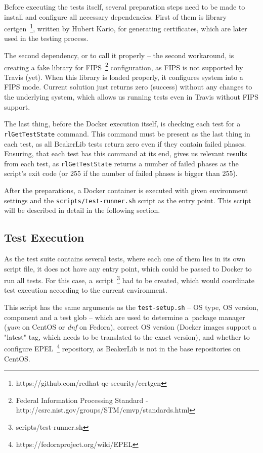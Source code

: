     Before executing the tests itself, several preparation steps need to be made
    to install and configure all necessary dependencies. First of them is
    library certgen~\footnote{https://github.com/redhat-qe-security/certgen},
    written by Hubert Kario, for generating certificates, which are later used
    in the testing process.

    The second dependency, or to call it properly -- the second workaround, is
    creating a fake library for
    FIPS~\footnote{Federal Information Processing Standard - http://csrc.nist.gov/groups/STM/cmvp/standards.html}
    configuration, as FIPS is not supported
    by Travis (yet). When this library is loaded properly, it configures
    system into a FIPS mode. Current solution just returns zero (success) without
    any changes to the underlying system, which allows us running tests even in
    Travis without FIPS support.

    The last thing, before the Docker execution itself, is checking each test
    for a \texttt{rlGetTestState} command. This command must be present as
    the last thing in each test, as all BeakerLib tests return zero even
    if they contain failed phases. Ensuring, that each test has this command
    at its end, gives us relevant results from each test, as
    \texttt{rlGetTestState} returns a number of failed phases as the script's
    exit code (or 255 if the number of failed phases is bigger
    than 255).~\cite{beakerlib-gh-man}

    After the preparations, a Docker container is executed with given environment
    settings and the \texttt{scripts/test-runner.sh} script as the entry point.
    This script will be described in detail in the following section.

\subsection{Test Execution} \label{ref:test-execution}
    As the test suite contains several tests, where each one of them lies in
    its own script file, it does not have any entry point, which could be passed
    to Docker to run all tests. For this case,
    a~script~\footnote{scripts/test-runner.sh} had to be created,
    which would coordinate test execution according to the current environment.

    This script has the same arguments as the \texttt{test-setup.sh} -- OS type,
    OS version, component and a test glob -- which are used to determine
    a~package manager (\textit{yum} on CentOS or \textit{dnf} on Fedora), correct OS version
    (Docker images support a "latest" tag, which needs to be translated to
    the exact version), and whether to configure
    EPEL~\footnote{https://fedoraproject.org/wiki/EPEL} repository, as BeakerLib
    is not in the base repositories on CentOS.

